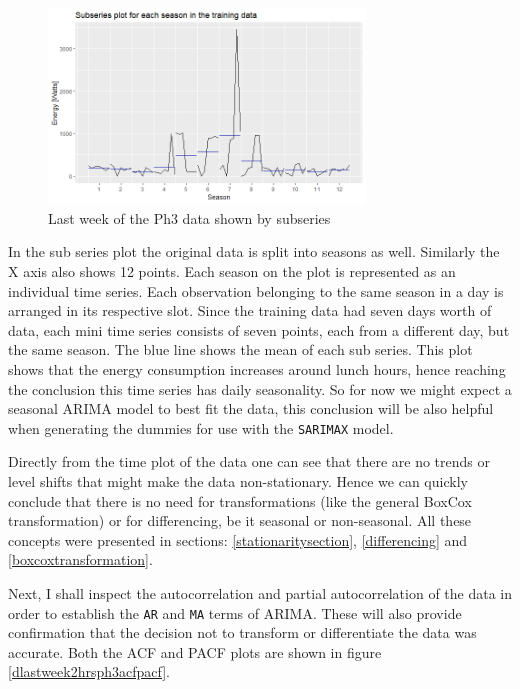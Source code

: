 \documentclass[12pt,a4paper,titlepage]{report}
\begin{document}
\begin{figure}[h]
    \centering
    \includegraphics[width=0.75\textwidth]{dlastweek2hrsph3subseries}
    \caption{Last week of the Ph3 data shown by subseries}
    \label{dlastweek2hrsph3subseries}
\end{figure}

In the sub series plot the original data is split into seasons as well. Similarly the X axis also shows 12 points.
Each season on the plot is represented as an individual time series. Each observation belonging to the same season in a day is arranged in its respective slot. Since the training data had seven days worth of data, each mini time series consists of seven points, each from a different day, but the same season. The blue line shows the mean of each sub series. This plot shows that the energy consumption increases around lunch hours, hence reaching the conclusion this time series has daily seasonality.
So for now we might expect a seasonal ARIMA model to best fit the data, this conclusion will be also helpful when generating the dummies for use with the \texttt{SARIMAX} model.

Directly from the time plot of the data one can see that there are no trends or level shifts that might make the data non-stationary. Hence we can quickly conclude that there is no need for transformations (like the general BoxCox transformation) or for differencing, be it seasonal or non-seasonal. All these concepts were presented in sections: \ref{stationaritysection}, \ref{differencing} and \ref{boxcoxtransformation}.

Next, I shall inspect the autocorrelation and partial autocorrelation of the data in order to establish the \texttt{AR} and \texttt{MA} terms of ARIMA. These will also provide confirmation that the decision not to transform or differentiate the data was accurate. Both the ACF and PACF plots are shown in figure \ref{dlastweek2hrsph3acfpacf}.
\end{document}
